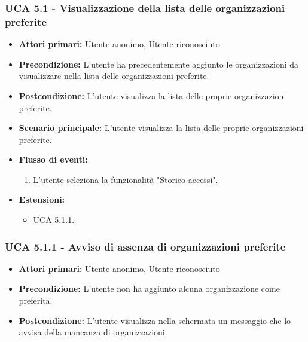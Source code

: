 \subsubsection{UCA 5.1 - Visualizzazione della lista delle organizzazioni preferite}
\begin{itemize}
    \item \textbf{Attori primari:} Utente anonimo, Utente riconosciuto
    \item \textbf{Precondizione:} L'utente ha precedentemente aggiunto le organizzazioni da visualizzare nella lista delle organizzazioni preferite.
    \item \textbf{Postcondizione:} L'utente visualizza la lista delle proprie organizzazioni preferite.
    \item \textbf{Scenario principale:} L'utente visualizza la lista delle proprie organizzazioni preferite.
    \item \textbf{Flusso di eventi:}
    \begin{enumerate}
        \item L'utente seleziona la funzionalità "Storico accessi".
    \end{enumerate}
    \item \textbf{Estensioni:}
    \begin{itemize}
        \item UCA 5.1.1.
    \end{itemize}
\end{itemize}

\subsubsection{UCA 5.1.1 - Avviso di assenza di organizzazioni preferite}
\begin{itemize}
    \item \textbf{Attori primari:} Utente anonimo, Utente riconosciuto
    \item \textbf{Precondizione:} L'utente non ha aggiunto alcuna organizzazione come preferita.
    \item \textbf{Postcondizione:} L'utente visualizza nella schermata un messaggio che lo avvisa della mancanza di organizzazioni.
\end{itemize}

